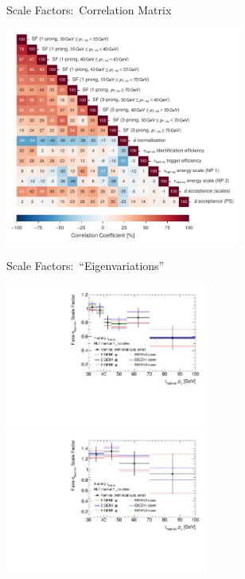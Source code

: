 \documentclass[11pt, xcolor={dvipsnames}, aspectratio=169, notes]{beamer}
\begin{document}

\begin{frame}{Scale Factors:\ Correlation Matrix}
  \centering

  \includegraphics[width=0.58\textwidth]{ttbarSF/correlation_matrix}
\end{frame}


\begin{frame}{Scale Factors:\ ``Eigenvariations''}
  \centering

  \includegraphics[width=0.5\textwidth]{ttbarSF/ttbarSF_eigvar_1p}%
  \includegraphics[width=0.5\textwidth]{ttbarSF/ttbarSF_eigvar_3p}
\end{frame}

\end{document}
